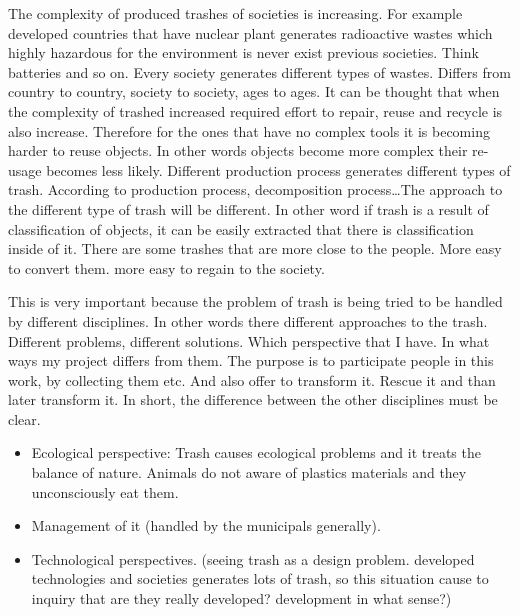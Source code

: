 The complexity of produced trashes of societies is increasing. For example developed countries that have nuclear plant generates radioactive wastes which highly hazardous for the environment is never exist previous societies. Think batteries and so on. Every society generates different types of wastes. Differs from country to country, society to society, ages to ages. It can be thought that when the complexity of trashed increased required effort to repair, reuse and recycle is also increase. Therefore for the ones that have no complex tools it is becoming harder to reuse objects. In other words objects become more complex their re-usage becomes less likely.  Different production process generates different types of trash. According to production process, decomposition process\ldots The approach to the different type of trash will be different. In other word if trash is a result of classification of objects, it can be easily extracted that there is classification inside of it. There are some trashes that are more close to the people. More easy to convert them. more easy to regain to the society. 


 


This is very important because the problem of trash is being tried to be handled by different disciplines. In other words there different approaches to the trash. Different problems, different solutions. Which perspective that I have. In what ways my project differs from them. The purpose is to participate people in this work, by collecting them etc. And also offer to transform it. Rescue it and than later transform it. In short, the difference between the other disciplines must be clear. 
\begin{itemize}
\item Ecological perspective: Trash causes ecological problems and it treats the balance of nature. Animals do not aware of plastics materials and they unconsciously eat them.
\item Management of it (handled by the municipals generally).
\item Technological perspectives. (seeing trash as a design problem. developed technologies and societies generates lots of trash, so this situation cause to inquiry that are they really developed? development in what sense?)
\end{itemize}

